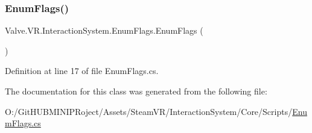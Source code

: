 \subsubsection{\texorpdfstring{EnumFlags()}{EnumFlags()}}
{\footnotesize\ttfamily Valve.\+V\+R.\+Interaction\+System.\+Enum\+Flags.\+Enum\+Flags (\begin{DoxyParamCaption}{ }\end{DoxyParamCaption})}



Definition at line 17 of file Enum\+Flags.\+cs.



The documentation for this class was generated from the following file\+:\begin{DoxyCompactItemize}
\item 
O\+:/\+Git\+H\+U\+B\+M\+I\+N\+I\+P\+Roject/\+Assets/\+Steam\+V\+R/\+Interaction\+System/\+Core/\+Scripts/\mbox{\hyperlink{_steam_v_r_2_interaction_system_2_core_2_scripts_2_enum_flags_8cs}{Enum\+Flags.\+cs}}\end{DoxyCompactItemize}
